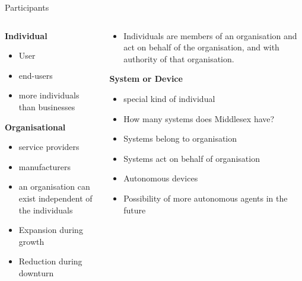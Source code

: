 \documentclass[pdf,table]{beamer}
\begin{document}
\begin{frame}{Participants}
	\begin{columns}[T]
		\begin{column}{0.48\textwidth}
			{\bf Individual}
			\begin{itemize}
				\item User 
				\item end-users 
				\item more individuals than businesses 
			\end{itemize}
			{\bf Organisational}
			\begin{itemize}
				\item service providers
				\item manufacturers
				\item an organisation can exist independent of the individuals %
				\item Expansion during growth
				\item Reduction during downturn
			\end{itemize}
		\end{column}
		\begin{column}{0.48\textwidth}
			\begin{itemize}
				\item Individuals are members of an organisation and act on behalf of the organisation, and with authority of that organisation.
			\end{itemize}			
			{\bf System or Device}
			\begin{itemize}
				\item special kind of individual
				\item How many systems does Middlesex have? %
				\item Systems belong to organisation
				\item Systems act on behalf of organisation
				\item Autonomous devices 
				\item Possibility of more autonomous agents in the future
			\end{itemize}
		\end{column}
	\end{columns}	
\end{frame}
\end{document}
